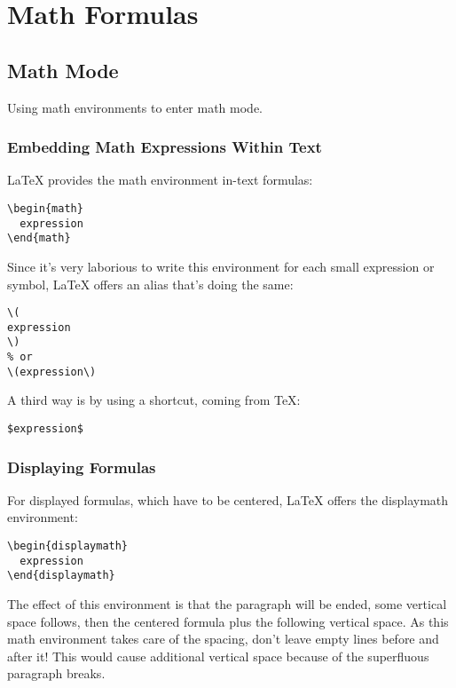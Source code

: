 
\chapter{Math Formulas}
\label{cha:math-formulas}

\section{Math Mode}
\label{sec:math-mode}

Using math environments to enter math mode.

\subsection{Embedding Math Expressions Within Text}
\label{sec:embedd-math-expr}

LaTeX provides the math environment in-text formulas:
\begin{lstlisting}
\begin{math}
  expression
\end{math}
\end{lstlisting}


Since it's very laborious to write this environment for each small expression or symbol, LaTeX offers an alias that's doing the same:
\begin{lstlisting}
\(
expression
\)
% or
\(expression\)
\end{lstlisting}

A third way is by using a shortcut, coming from TeX:
\begin{lstlisting}
$expression$
\end{lstlisting}

\subsection{Displaying Formulas}
\label{sec:displaying-formulas}

For displayed formulas, which have to be centered, LaTeX offers the displaymath environment:
\begin{lstlisting}
\begin{displaymath}
  expression
\end{displaymath}
\end{lstlisting}

The effect of this environment is that the paragraph will be ended, some vertical space follows, then the centered formula plus the following vertical space.
As this math environment takes care of the spacing, don't leave empty lines before and after it!
This would cause additional vertical space because of the superfluous paragraph breaks.

